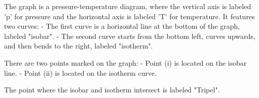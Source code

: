 The graph is a pressure-temperature diagram, where the vertical axis is labeled 'p' for pressure and the horizontal axis is labeled 'T' for temperature. It features two curves:
- The first curve is a horizontal line at the bottom of the graph, labeled "isobar".
- The second curve starts from the bottom left, curves upwards, and then bends to the right, labeled "isotherm".

There are two points marked on the graph:
- Point (i) is located on the isobar line.
- Point (ii) is located on the isotherm curve.

The point where the isobar and isotherm intersect is labeled "Tripel".